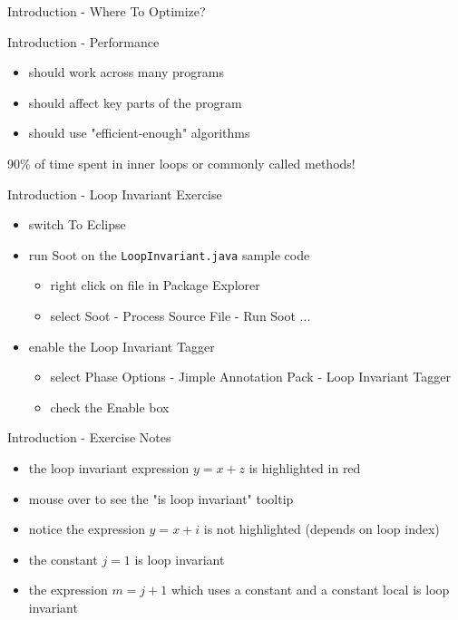 \documentclass[mcgill,slideColor,colorBG,pdf]{prosper}
\begin{document}
\begin{slide} {Introduction - Where To Optimize?}
\end{slide}

\begin{slide} {Introduction - Performance}
\begin{itemize}
\item should work across many programs
\item should affect key parts of the program
\item should use "efficient-enough" algorithms
\end{itemize}
90\% of time spent in inner loops or commonly called methods!
\end{slide}

\begin{slide} {Introduction - Loop Invariant Exercise}
\begin{itemize}
\item switch To Eclipse
\item run Soot on the \texttt{LoopInvariant.java} sample code
\begin{itemize}
\item right click on file in Package Explorer
\item select Soot - Process Source File - Run Soot ...
\end{itemize}
\item enable the Loop Invariant Tagger
\begin{itemize}
\item select Phase Options - Jimple Annotation Pack - Loop Invariant Tagger
\item check the Enable box
\end{itemize}
\end{itemize}
\end{slide}

\begin{slide} {Introduction - Exercise Notes}
\begin{itemize}
\item the loop invariant expression $y = x + z$ is highlighted in red
\item mouse over to see the "is loop invariant" tooltip
\item notice the expression $y = x + i$ is not highlighted (depends on loop index)
\item the constant $j = 1$ is loop invariant
\item the expression $m = j + 1$ which uses a constant and a constant local is loop invariant
\end{itemize}
\end{slide}
\end{document}
